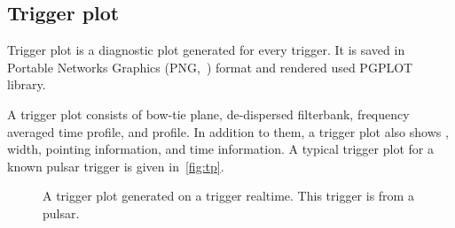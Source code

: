 \subsection {Trigger plot}
\par Trigger plot is a diagnostic plot generated for every trigger. 
It is saved in Portable Networks Graphics (PNG,~\cite{png}) format and rendered used PGPLOT~\cite{pgplot} library.

\par A trigger plot consists of bow-tie plane, de-dispersed filterbank, frequency averaged time profile, and \dm profile. 
In addition to them, a trigger plot also shows \sn, width, pointing information, and time information.
A typical trigger plot for a known pulsar trigger is given in~\autoref{fig:tp}.

\begin{figure}
	\label{fig:tp}
	\caption{A trigger plot generated on a trigger realtime. This trigger is from a pulsar.}
\end{figure}

